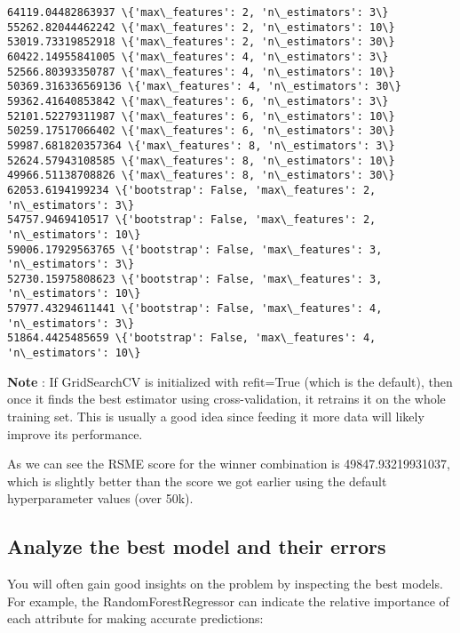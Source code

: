 \documentclass[11pt]{article}
\begin{document}
    \begin{Verbatim}[commandchars=\\\{\}]
64119.04482863937 \{'max\_features': 2, 'n\_estimators': 3\}
55262.82044462242 \{'max\_features': 2, 'n\_estimators': 10\}
53019.73319852918 \{'max\_features': 2, 'n\_estimators': 30\}
60422.14955841005 \{'max\_features': 4, 'n\_estimators': 3\}
52566.80393350787 \{'max\_features': 4, 'n\_estimators': 10\}
50369.316336569136 \{'max\_features': 4, 'n\_estimators': 30\}
59362.41640853842 \{'max\_features': 6, 'n\_estimators': 3\}
52101.52279311987 \{'max\_features': 6, 'n\_estimators': 10\}
50259.17517066402 \{'max\_features': 6, 'n\_estimators': 30\}
59987.681820357364 \{'max\_features': 8, 'n\_estimators': 3\}
52624.57943108585 \{'max\_features': 8, 'n\_estimators': 10\}
49966.51138708826 \{'max\_features': 8, 'n\_estimators': 30\}
62053.6194199234 \{'bootstrap': False, 'max\_features': 2, 'n\_estimators': 3\}
54757.9469410517 \{'bootstrap': False, 'max\_features': 2, 'n\_estimators': 10\}
59006.17929563765 \{'bootstrap': False, 'max\_features': 3, 'n\_estimators': 3\}
52730.15975808623 \{'bootstrap': False, 'max\_features': 3, 'n\_estimators': 10\}
57977.43294611441 \{'bootstrap': False, 'max\_features': 4, 'n\_estimators': 3\}
51864.4425485659 \{'bootstrap': False, 'max\_features': 4, 'n\_estimators': 10\}
    \end{Verbatim}

    \textbf{Note} : If GridSearchCV is initialized with refit=True (which is
the default), then once it finds the best estimator using
cross-validation, it retrains it on the whole training set. This is
usually a good idea since feeding it more data will likely improve its
performance.

As we can see the RSME score for the winner combination is
49847.93219931037, which is slightly better than the score we got
earlier using the default hyperparameter values (over 50k).

    \hypertarget{analyze-the-best-model-and-their-errors}{%
\subsection{Analyze the best model and their
errors}\label{analyze-the-best-model-and-their-errors}}

    You will often gain good insights on the problem by inspecting the best
models. For example, the RandomForestRegressor can indicate the relative
importance of each attribute for making accurate predictions:
\end{document}
